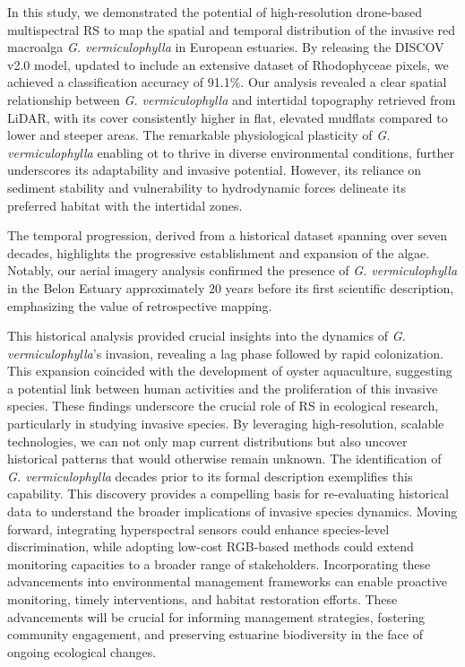 \documentclass[
  letterpaper,
  11pt,
  english,
  singlespacing,
  headsepline]{MastersDoctoralThesis}
\begin{document}
\begin{spacing}{1.5}
In this study, we demonstrated the potential of high-resolution
drone-based multispectral RS to map the spatial and temporal
distribution of the invasive red macroalga \emph{G. vermiculophylla} in
European estuaries. By releasing the DISCOV v2.0 model, updated to
include an extensive dataset of Rhodophyceae pixels, we achieved a
classification accuracy of 91.1\%. Our analysis revealed a clear spatial
relationship between \emph{G. vermiculophylla} and intertidal topography
retrieved from LiDAR, with its cover consistently higher in flat,
elevated mudflats compared to lower and steeper areas. The remarkable
physiological plasticity of \emph{G. vermiculophylla} enabling ot to
thrive in diverse environmental conditions, further underscores its
adaptability and invasive potential. However, its reliance on sediment
stability and vulnerability to hydrodynamic forces delineate its
preferred habitat with the intertidal zones.

The temporal progression, derived from a historical dataset spanning
over seven decades, highlights the progressive establishment and
expansion of the algae. Notably, our aerial imagery analysis confirmed
the presence of \emph{G. vermiculophylla} in the Belon Estuary
approximately 20 years before its first scientific description,
emphasizing the value of retrospective mapping.

This historical analysis provided crucial insights into the dynamics of
\emph{G. vermiculophylla}'s invasion, revealing a lag phase followed by
rapid colonization. This expansion coincided with the development of
oyster aquaculture, suggesting a potential link between human activities
and the proliferation of this invasive species. These findings
underscore the crucial role of RS in ecological research, particularly
in studying invasive species. By leveraging high-resolution, scalable
technologies, we can not only map current distributions but also uncover
historical patterns that would otherwise remain unknown. The
identification of \emph{G. vermiculophylla} decades prior to its formal
description exemplifies this capability. This discovery provides a
compelling basis for re-evaluating historical data to understand the
broader implications of invasive species dynamics. Moving forward,
integrating hyperspectral sensors could enhance species-level
discrimination, while adopting low-cost RGB-based methods could extend
monitoring capacities to a broader range of stakeholders. Incorporating
these advancements into environmental management frameworks can enable
proactive monitoring, timely interventions, and habitat restoration
efforts. These advancements will be crucial for informing management
strategies, fostering community engagement, and preserving estuarine
biodiversity in the face of ongoing ecological changes.


\end{spacing}
\end{document}
